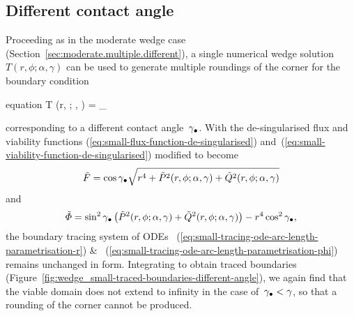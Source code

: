 \subsection{Different contact angle}
\label{sec:small.rounding.different}

Proceeding as in the moderate wedge case
(Section~\ref{sec:moderate.multiple.different}),
a single numerical wedge solution~$T (r, \phi; \alpha, \gamma)$
can be used to generate multiple roundings of the corner
for the boundary condition
\begin{important}{equation}
  \normalvec \dotp \del T (r, \phi; \alpha, \gamma) =
    \cos\gamma_\tr
  \label{eq:small-flux-boundary-condition-different-angle}
\end{important}
corresponding to a different contact angle~$\gamma_\bullet$.
With the de-singularised flux and viability functions
(\ref{eq:small-flux-function-de-singularised})
and~(\ref{eq:small-viability-function-de-singularised})
modified to become
\begin{equation}
  \tilde{F} =
    \cos\gamma_\bullet
    \sqrt{
      r^4
      + \tilde{P}^2 (r, \phi; \alpha, \gamma)
      + \tilde{Q}^2 (r, \phi; \alpha, \gamma)
    }
  \label{eq:small-flux-function-de-singularised-different-angle}
\end{equation}
and
\begin{equation}
  \desing{\Phi} =
    \sin^2\gamma_\tr \,
    \roundbr*{
      \desing{P}^2 (r, \phi; \alpha, \gamma)
        +
      \desing{Q}^2 (r, \phi; \alpha, \gamma)
    }
      - r^4 \cos^2\gamma_\tr,
  \label{eq:small-viability-function-de-singularised-different-angle}
\end{equation}
the boundary tracing system of ODEs~%
  (\ref{eq:small-tracing-ode-arc-length-parametrisation-r})
\&~%
  (\ref{eq:small-tracing-ode-arc-length-parametrisation-phi})
remains unchanged in form.
Integrating to obtain traced boundaries
(Figure~\ref{fig:wedge_small-traced-boundaries-different-angle}),
we again find that the viable domain does not extend to infinity
in the case of~$\gamma_\bullet < \gamma$,
so that a rounding of the corner cannot be produced.

